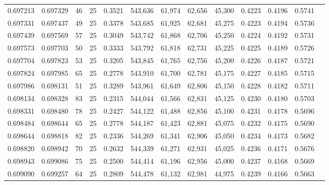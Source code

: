 \begin{tabular}{rrrrrrrrrrrrr}
0.697213 & 0.697329 &    46 &  25 &                                     0.3521 & 543,636 &  61,974 &  62,656 &  45,300 & 0.4223 & 0.4196 & 0.5741 \\
0.697331 & 0.697437 &    49 &  25 &                                     0.3378 & 543,685 &  61,925 &  62,681 &  45,275 & 0.4223 & 0.4194 & 0.5736 \\
0.697439 & 0.697569 &    57 &  25 &                                     0.3049 & 543,742 &  61,868 &  62,706 &  45,250 & 0.4224 & 0.4192 & 0.5731 \\
0.697573 & 0.697703 &    50 &  25 &                                     0.3333 & 543,792 &  61,818 &  62,731 &  45,225 & 0.4225 & 0.4189 & 0.5726 \\
0.697704 & 0.697823 &    53 &  25 &                                     0.3205 & 543,845 &  61,765 &  62,756 &  45,200 & 0.4226 & 0.4187 & 0.5721 \\
0.697824 & 0.697985 &    65 &  25 &                                     0.2778 & 543,910 &  61,700 &  62,781 &  45,175 & 0.4227 & 0.4185 & 0.5715 \\
0.697986 & 0.698131 &    51 &  25 &                                     0.3289 & 543,961 &  61,649 &  62,806 &  45,150 & 0.4228 & 0.4182 & 0.5711 \\
0.698134 & 0.698328 &    83 &  25 &                                     0.2315 & 544,044 &  61,566 &  62,831 &  45,125 & 0.4230 & 0.4180 & 0.5703 \\
0.698331 & 0.698480 &    78 &  25 &                                     0.2427 & 544,122 &  61,488 &  62,856 &  45,100 & 0.4231 & 0.4178 & 0.5696 \\
0.698484 & 0.698644 &    65 &  25 &                                     0.2778 & 544,187 &  61,423 &  62,881 &  45,075 & 0.4232 & 0.4175 & 0.5690 \\
0.698644 & 0.698818 &    82 &  25 &                                     0.2336 & 544,269 &  61,341 &  62,906 &  45,050 & 0.4234 & 0.4173 & 0.5682 \\
0.698820 & 0.698942 &    70 &  25 &                                     0.2632 & 544,339 &  61,271 &  62,931 &  45,025 & 0.4236 & 0.4171 & 0.5676 \\
0.698943 & 0.699086 &    75 &  25 &                                     0.2500 & 544,414 &  61,196 &  62,956 &  45,000 & 0.4237 & 0.4168 & 0.5669 \\
0.699090 & 0.699257 &    64 &  25 &                                     0.2809 & 544,478 &  61,132 &  62,981 &  44,975 & 0.4239 & 0.4166 & 0.5663 \\

\end{tabular}
